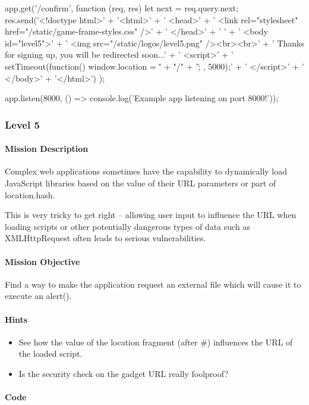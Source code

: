 \begin{Exercise}[label={websec-xss-game}]
\begin{js}
  app.get('/confirm', function (req, res) {
  let next = req.query.next;
  res.send('<!doctype html>\n' +
  '<html>\n' +
  '  <head>\n' +
  '    <link rel="stylesheet" href="/static/game-frame-styles.css" />\n' +
  '  </head>\n' +
  ' \n' +
  '  <body id="level5">\n' +
  '    <img src="/static/logos/level5.png" /><br><br>\n' +
  '    Thanks for signing up, you will be redirected soon...\n' +
  '    <script>\n' +
  '      setTimeout(function() { window.location = \'' + "/" + '\'; }, 5000);\n' +
  '    </script>\n' +
  '  </body>\n' +
  '</html>')
});

app.listen(8000, () => console.log('Example app listening on port 8000!'));
\end{js}
	\subsubsection{Level 5}
\paragraph{Mission Description}
Complex web applications sometimes have the capability to dynamically load JavaScript libraries based on the value of their URL parameters or part of location.hash. 

This is very tricky to get right -- allowing user input to influence the URL when loading scripts or other potentially dangerous types of data such as XMLHttpRequest often leads to serious vulnerabilities.


\paragraph{Mission Objective}
Find a way to make the application request an external file which will cause it to execute an alert(). 

\paragraph{Hints}
\begin{itemize}
\item See how the value of the location fragment (after \#) influences the URL of the loaded script.
\item Is the security check on the gadget URL really foolproof?
\end{itemize}
\paragraph{Code}


\end{Exercise}
